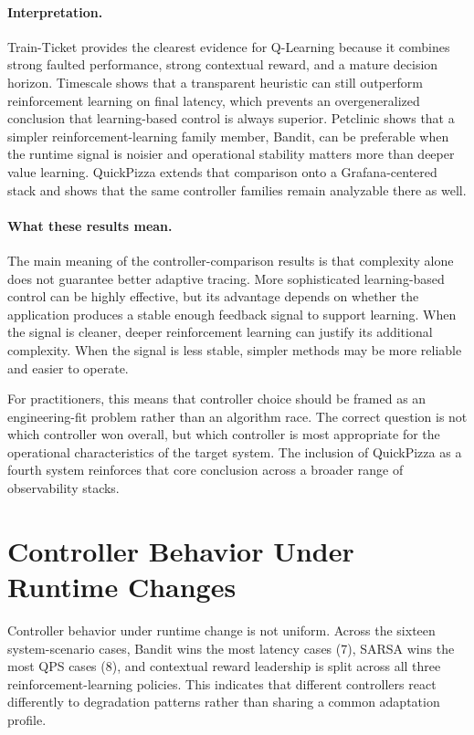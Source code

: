 \documentclass[10pt,twocolumn]{article}
\begin{document}
\paragraph{Interpretation.} Train-Ticket provides the clearest evidence for Q-Learning because it combines strong faulted performance, strong contextual reward, and a mature decision horizon. Timescale shows that a transparent heuristic can still outperform reinforcement learning on final latency, which prevents an overgeneralized conclusion that learning-based control is always superior. Petclinic shows that a simpler reinforcement-learning family member, Bandit, can be preferable when the runtime signal is noisier and operational stability matters more than deeper value learning. QuickPizza extends that comparison onto a Grafana-centered stack and shows that the same controller families remain analyzable there as well.

\paragraph{What these results mean.} The main meaning of the controller-comparison results is that complexity alone does not guarantee better adaptive tracing. More sophisticated learning-based control can be highly effective, but its advantage depends on whether the application produces a stable enough feedback signal to support learning. When the signal is cleaner, deeper reinforcement learning can justify its additional complexity. When the signal is less stable, simpler methods may be more reliable and easier to operate.

For practitioners, this means that controller choice should be framed as an engineering-fit problem rather than an algorithm race. The correct question is not which controller won overall, but which controller is most appropriate for the operational characteristics of the target system. The inclusion of QuickPizza as a fourth system reinforces that core conclusion across a broader range of observability stacks.
\FloatBarrier

\section{Controller Behavior Under Runtime Changes}
Controller behavior under runtime change is not uniform. Across the sixteen system-scenario cases, Bandit wins the most latency cases (7), SARSA wins the most QPS cases (8), and contextual reward leadership is split across all three reinforcement-learning policies. This indicates that different controllers react differently to degradation patterns rather than sharing a common adaptation profile.
\end{document}
